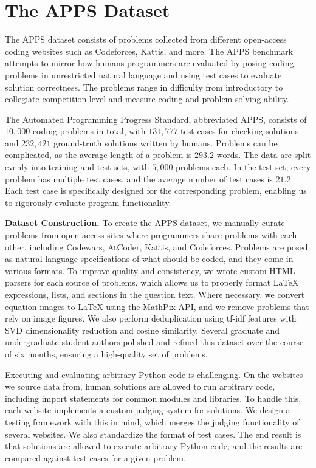 \section{The APPS Dataset}\label{sec:dataset}

The APPS dataset consists of problems collected from different open-access coding websites such as Codeforces, Kattis, and more. The APPS benchmark attempts to mirror how humans programmers are evaluated by posing coding problems in unrestricted natural language and using test cases to evaluate solution correctness. The problems range in difficulty from introductory to collegiate competition level and measure coding and problem-solving ability. 

The Automated Programming Progress Standard, abbreviated APPS, consists of $10,\!000$ coding problems in total, with $131,\!777$ test cases for checking solutions and $232,\!421$ ground-truth solutions written by humans. Problems can be complicated, as the average length of a problem is $293.2$ words.
The data are split evenly into training and test sets, with $5,\!000$ problems each. In the test set, every problem has multiple test cases, and the average number of test cases is $21.2$. Each test case is specifically designed for the corresponding problem, enabling us to rigorously evaluate program functionality.

  






\noindent\textbf{Dataset Construction.}\quad
To create the APPS dataset, we manually curate problems from open-access sites where programmers share problems with each other, including Codewars, AtCoder, Kattis, and Codeforces. Problems are posed as natural language specifications of what should be coded, and they come in various formats. To improve quality and consistency, we wrote custom HTML parsers for each source of problems, which allows us to properly format LaTeX expressions, lists, and sections in the question text. Where necessary, we convert equation images to LaTeX using the MathPix API, and we remove problems that rely on image figures. We also perform deduplication using tf-idf features with SVD dimensionality reduction and cosine similarity. Several graduate and undergraduate student authors polished and refined this dataset over the course of six months, ensuring a high-quality set of problems.

Executing and evaluating arbitrary Python code is challenging. On the websites we source data from, human solutions are allowed to run arbitrary code, including import statements for common modules and libraries. To handle this, each website implements a custom judging system for solutions. We design a testing framework with this in mind, which merges the judging functionality of several websites. We also standardize the format of test cases. The end result is that solutions are allowed to execute arbitrary Python code, and the results are compared against test cases for a given problem.



